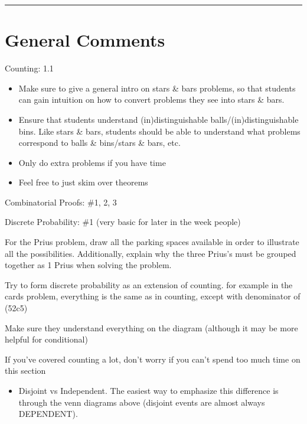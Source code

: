 \documentclass{exam}
\title{}
\date{Berlekamp-Welsh, Countability, Self Reference, Counting}
\begin{document}
\maketitle
\rule{\textwidth}{0.15em}
\fontsize{12}{15}\selectfont
\thispagestyle{empty}


\section{General Comments}
\begin{questions}
\item Counting: 1.1
\begin{itemize}
\item Make sure to give a general intro on stars \& bars problems, so that students can gain intuition on how to convert problems they see into stars \& bars. 
\item Ensure that students understand (in)distinguishable balls/(in)distinguishable bins. Like stars \& bars, students should be able to understand what problems correspond to balls \& bins/stars \& bars, etc.
\item Only do extra problems if you have time
\item Feel free to just skim over theorems
\end{itemize}
\item Combinatorial Proofs: \#1, 2, 3
\item Discrete Probability: \#1 (very basic for later in the week people)
\item For the Prius problem, draw all the parking spaces available in order to illustrate all the possibilities. Additionally, explain why the three Prius's must be grouped together as 1 Prius when solving the problem.
\item Try to form discrete probability as an extension of counting. for example in the cards problem, everything is the same as in counting, except with denominator of (52c5)
\item Make sure they understand everything on the diagram (although it may be more helpful for conditional)
\item If you've covered counting a lot, don't worry if you can't spend too much time on this section
\begin{itemize}
\item Disjoint vs Independent. The easiest way to emphasize this difference is through the venn diagrams above (disjoint events are almost always DEPENDENT).

\end{itemize}
\end{questions}
\end{document}
